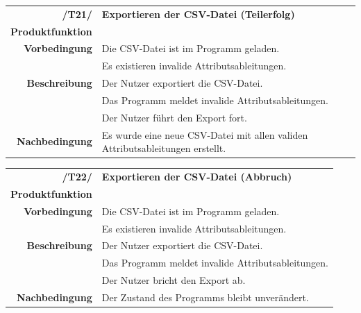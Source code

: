 \documentclass{article}
\begin{document}
\begin{table}[H]
\begin{tabularx}{\textwidth}{rX}
 \vspace{1mm}
\textbf{/T21/}         & \textbf{Exportieren der CSV-Datei (Teilerfolg)} \\ \vspace{1mm}
\textbf{Produktfunktion} & \nameref{sec:f:CSV-Datei exportieren} \\
\textbf{Vorbedingung}  & Die CSV-Datei ist im Programm geladen. \\ \vspace{1mm} & Es existieren invalide Attributsableitungen. \\
\textbf{Beschreibung}  & Der Nutzer exportiert die CSV-Datei. \\ & Das Programm meldet invalide Attributsableitungen. \\ \vspace{1mm} & Der Nutzer führt den Export fort. \\
\textbf{Nachbedingung} & Es wurde eine neue CSV-Datei mit allen validen Attributsableitungen erstellt.
\end{tabularx}
\end{table}

\begin{table}[H]
\begin{tabularx}{\textwidth}{rX}
 \vspace{1mm}
\textbf{/T22/}         & \textbf{Exportieren der CSV-Datei (Abbruch)} \\ \vspace{1mm}
\textbf{Produktfunktion} & \nameref{sec:f:CSV-Datei exportieren} \\
\textbf{Vorbedingung}  & Die CSV-Datei ist im Programm geladen. \\  \vspace{1mm}& Es existieren invalide Attributsableitungen. \\
\textbf{Beschreibung}  & Der Nutzer exportiert die CSV-Datei. \\ & Das Programm meldet invalide Attributsableitungen. \\ \vspace{1mm} & Der Nutzer bricht den Export ab. \\
\textbf{Nachbedingung} & Der Zustand des Programms bleibt unverändert.
\end{tabularx}
\end{table}
\end{document}
